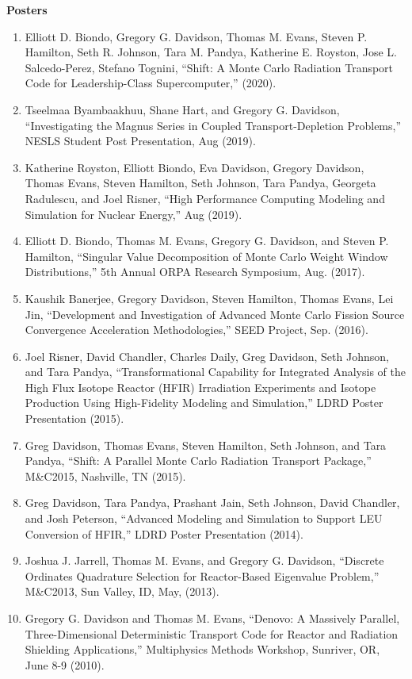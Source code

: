 \documentclass[letterpaper,11pt]{article}
\newcommand{\leftsubheading}[1]{
  \textbf{#1\vspace{-6pt} \\}}
\begin{document}
\leftsubheading{Posters}
\begin{enumerate}
   \item Elliott D. Biondo, Gregory G. Davidson, Thomas M. Evans,
     Steven P. Hamilton, Seth R. Johnson, Tara M. Pandya, Katherine
     E. Royston, Jose L. Salcedo-Perez, Stefano Tognini, ``Shift: A
     Monte Carlo Radiation Transport Code for Leadership-Class
     Supercomputer,'' (2020).
  \item Tseelmaa Byambaakhuu, Shane Hart, and Gregory G. Davidson,
    ``Investigating the Magnus Series in Coupled Transport-Depletion
    Problems,'' NESLS Student Post Presentation, Aug (2019).
  \item Katherine Royston, Elliott Biondo, Eva Davidson, Gregory
    Davidson, Thomas Evans, Steven Hamilton, Seth Johnson, Tara
    Pandya, Georgeta Radulescu, and Joel Risner, ``High Performance
    Computing Modeling and Simulation for Nuclear Energy,'' Aug (2019).
  \item Elliott D. Biondo, Thomas M. Evans, Gregory G. Davidson, and
    Steven P. Hamilton, ``Singular Value Decomposition of Monte Carlo
    Weight Window Distributions,'' 5th Annual ORPA Research Symposium,
    Aug. (2017).
  \item Kaushik Banerjee, Gregory Davidson, Steven Hamilton, Thomas
    Evans, Lei Jin, ``Development and Investigation of Advanced
    Monte Carlo Fission Source Convergence Acceleration
    Methodologies,'' SEED Project, Sep. (2016).
  \item Joel Risner, David Chandler, Charles Daily, Greg Davidson,
    Seth Johnson, and Tara Pandya, ``Transformational Capability for
    Integrated Analysis of the High Flux Isotope Reactor (HFIR)
    Irradiation Experiments and Isotope Production Using
    High-Fidelity Modeling and Simulation,'' LDRD Poster
    Presentation (2015).
  \item Greg Davidson, Thomas Evans, Steven Hamilton, Seth Johnson,
    and Tara Pandya, ``Shift: A Parallel Monte Carlo Radiation
    Transport Package,'' M\&C2015, Nashville, TN (2015). 
  \item Greg Davidson, Tara Pandya, Prashant Jain, Seth Johnson,
    David Chandler, and Josh Peterson, ``Advanced Modeling and
    Simulation to Support LEU Conversion of HFIR,'' LDRD Poster
    Presentation (2014).
  \item Joshua J. Jarrell, Thomas M. Evans, and Gregory G. Davidson,
    ``Discrete Ordinates Quadrature Selection for Reactor-Based
    Eigenvalue Problem,'' M\&C2013, Sun Valley, ID, May, (2013).
  \item Gregory G. Davidson and Thomas M. Evans, ``Denovo: A
    Massively Parallel, Three-Dimensional Deterministic Transport
    Code for Reactor and Radiation Shielding Applications,''
    Multiphysics Methods Workshop, Sunriver, OR, June 8-9 (2010).
\end{enumerate}
\end{document}
